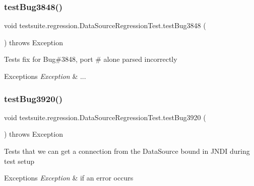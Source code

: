 \subsubsection{\texorpdfstring{test\+Bug3848()}{testBug3848()}}
{\footnotesize\ttfamily void testsuite.\+regression.\+Data\+Source\+Regression\+Test.\+test\+Bug3848 (\begin{DoxyParamCaption}{ }\end{DoxyParamCaption}) throws Exception}

Tests fix for Bug\#3848, port \# alone parsed incorrectly


\begin{DoxyExceptions}{Exceptions}
{\em Exception} & ... \\
\hline
\end{DoxyExceptions}
\mbox{\label{classtestsuite_1_1regression_1_1_data_source_regression_test_ac91c1a6dd9a345d051941b69a3193e57}} 
\subsubsection{\texorpdfstring{test\+Bug3920()}{testBug3920()}}
{\footnotesize\ttfamily void testsuite.\+regression.\+Data\+Source\+Regression\+Test.\+test\+Bug3920 (\begin{DoxyParamCaption}{ }\end{DoxyParamCaption}) throws Exception}

Tests that we can get a connection from the Data\+Source bound in J\+N\+DI during test setup


\begin{DoxyExceptions}{Exceptions}
{\em Exception} & if an error occurs \\
\hline
\end{DoxyExceptions}
\mbox{\label{classtestsuite_1_1regression_1_1_data_source_regression_test_a549c69563bb8fff0dbc64c72d6867f69}} 
